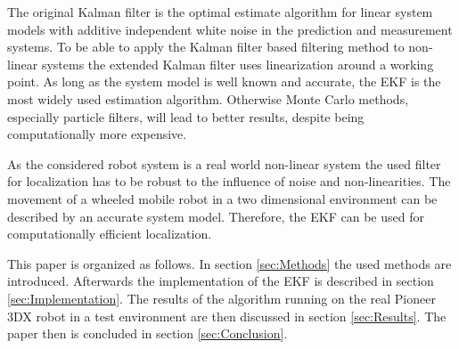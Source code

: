 The original Kalman filter is the optimal estimate algorithm for linear system models with additive independent white noise in the prediction and measurement systems. To be able to apply the Kalman filter based filtering method to non-linear systems the extended Kalman filter uses linearization around a working point. As long as the system model is well known and accurate, the EKF is the most widely used estimation algorithm. Otherwise Monte Carlo methods, especially particle filters, will lead to better results, despite being computationally more expensive. \cite{JulierUhlmann}

As the considered robot system is a real world non-linear system the used filter for localization has to be robust to the influence of noise and non-linearities. The movement of a wheeled mobile robot in a two dimensional environment can be described by an accurate system model. Therefore, the EKF  can be used for computationally efficient localization. \cite{Teslic}

This paper is organized as follows. In section \ref{sec:Methods} the used methods are introduced. Afterwards the implementation of the EKF is described in section \ref{sec:Implementation}. The results of the algorithm running on the real Pioneer 3DX robot in a test environment are then discussed in section \ref{sec:Results}. The paper then is concluded in section \ref{sec:Conclusion}.